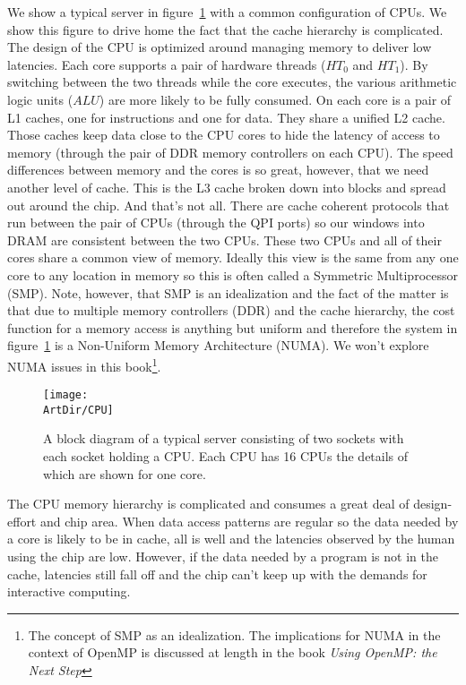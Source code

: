We show a typical server in figure~\ref{figure:CPU} with a common configuration of CPUs.   
We show this figure to drive home the fact that the cache hierarchy is complicated.  The design
of the CPU is optimized around managing memory to deliver low latencies.   Each core 
supports a pair of hardware threads ($HT_0$ and $HT_1$).  By switching between the two threads
while the core executes, the various arithmetic logic units ($ALU$) are more likely to be fully consumed.
On each core is a pair of L1 caches, one for instructions and one for
data.  They share a unified L2 cache.   Those caches keep data close to the CPU cores to hide the latency
of access to memory (through the pair of DDR memory controllers on each CPU).  The speed differences
between memory and the cores is so great, however, that we need another level of cache.  This is the L3 
cache broken down into blocks and spread out around the chip.   And that's not all.  There are cache coherent 
protocols that run between the pair of CPUs (through the QPI ports) so our windows into DRAM are 
consistent between the two CPUs.  These two CPUs and all of their cores share a common view of memory. 
Ideally this view is the same from any one core to any location in memory so this is often 
called a Symmetric Multiprocessor (SMP).   Note, however, that SMP is an idealization and the fact of the matter
is that due to multiple memory controllers (DDR) and the cache hierarchy, the cost function for a memory access is
anything but uniform and therefore the system in figure~\ref{figure:CPU} is a Non-Uniform Memory Architecture (NUMA).
We won't explore NUMA issues in this book\footnote{The concept of SMP as an idealization. The implications
for NUMA in the context of OpenMP is discussed at length in the book \emph{Using OpenMP: the Next Step}}.

\begin{figure}[t]
\centerline{\texttt{[image: \\ArtDir/CPU]}}
\caption{A block diagram of a typical server consisting of two sockets with each socket holding a CPU. Each
CPU has 16 CPUs the details of which are shown for one core.}
\label{figure:CPU}
\end{figure}

The CPU memory hierarchy is complicated and consumes a great deal of design-effort and chip area.  
When data access patterns are regular so the data needed by a core is likely to be in cache, all is well and 
the latencies observed by the human using the chip are low.  However, if the data needed by a program is
not in the cache, latencies still fall off and the chip can't keep up with the demands for interactive computing.

